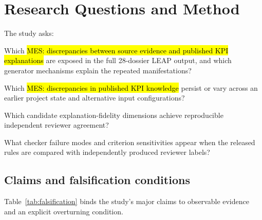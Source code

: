 \documentclass[a4paper,fleqn]{cas-dc}
\newcommand{\mes}[1]{{\sethlcolor{orange}\hl{MES: #1}}}
\begin{document}
\section{Research Questions and Method}
The study asks:
\begin{description}[leftmargin=1.2cm,style=nextline]
\item[RQ1] Which \mes{discrepancies between source evidence and published KPI explanations} are exposed in the full 28-dossier LEAP output, and which generator mechanisms explain the repeated manifestations?
\item[RQ2] Which \mes{discrepancies in published KPI knowledge} persist or vary across an earlier project state and alternative input configurations?
\item[RQ3] Which candidate explanation-fidelity dimensions achieve reproducible independent reviewer agreement?
\item[RQ4] What checker failure modes and criterion sensitivities appear when the released rules are compared with independently produced reviewer labels?
\end{description}

\subsection{Claims and falsification conditions}
Table~\ref{tab:falsification} binds the study's major claims to observable evidence and an explicit overturning condition.
\end{document}

